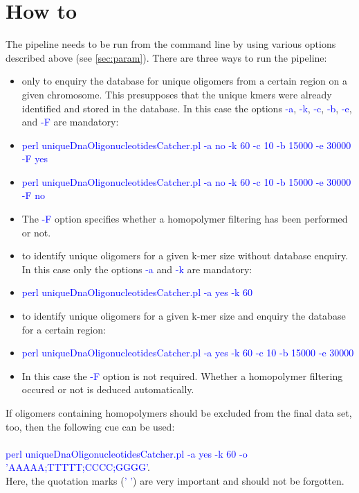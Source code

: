 \documentclass[a4paper,10pt]{report}
\begin{document}
\section{How to}
\label{sec:howto}
The pipeline needs to be run from the command line by using various options described above (see \ref{sec:param}). There are three ways to run the pipeline:
  \begin{itemize}
    \item only to enquiry the database for unique oligomers from a certain region on a given chromosome. This presupposes that the unique kmers were already identified
    and stored in the database. In this case the options \textcolor{blue}{-a}, \textcolor{blue}{-k}, \textcolor{blue}{-c}, \textcolor{blue}{-b}, \textcolor{blue}{-e}, and
    \textcolor{blue}{-F} are mandatory:
    \item[] \textcolor{blue}{perl uniqueDnaOligonucleotidesCatcher.pl -a no -k 60 -c 10 -b 15000 -e 30000 -F yes}
    \item[] \textcolor{blue}{perl uniqueDnaOligonucleotidesCatcher.pl -a no -k 60 -c 10 -b 15000 -e 30000 -F no}
    \item[] The \textcolor{blue}{-F} option specifies whether a homopolymer filtering has been performed or not.
    \item to identify unique oligomers for a given k-mer size without database enquiry. In this case only the options \textcolor{blue}{-a} and \textcolor{blue}{-k} are mandatory:
    \item[] \textcolor{blue}{perl uniqueDnaOligonucleotidesCatcher.pl -a yes -k 60}
    \item to identify unique oligomers for a given k-mer size and enquiry the database for a certain region:
    \item[] \textcolor{blue}{perl uniqueDnaOligonucleotidesCatcher.pl -a yes -k 60 -c 10 -b 15000 -e 30000}
    \item[] In this case the \textcolor{blue}{-F} option is not required. Whether a homopolymer filtering occured or not is deduced automatically.
  \end{itemize}
If oligomers containing homopolymers should be excluded from the final data set, too, then the following cue can be used:\\\\
\textcolor{blue}{perl uniqueDnaOligonucleotidesCatcher.pl -a yes -k 60 -o 'AAAAA;TTTTT;CCCC;GGGG'}.\\
Here, the quotation marks (\textcolor{blue}{' '}) are very important and should not be forgotten.
\end{document}
